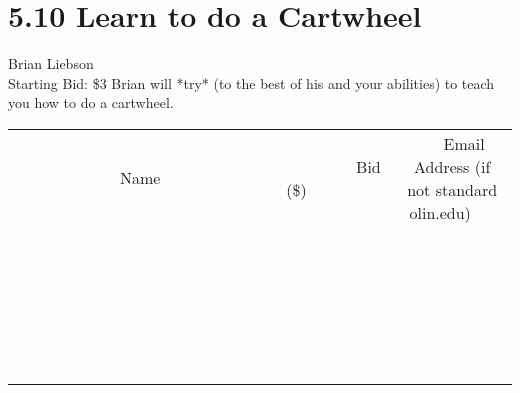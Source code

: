 \documentclass[11pt]{article}
\begin{document}
\section*{5.10 Learn to do a Cartwheel}
Brian Liebson
\\
Starting Bid: \$3
\newline
Brian will *try* (to the best of his and your abilities) to teach you how to do a cartwheel.
\\[6ex]
\begin{tabular}{c c c}
~~~~~~~~~~~~~Name~~~~~~~~~~~~~ & ~~~~~~~~~Bid (\$)~~~~~~~~~  & ~~~Email Address (if not standard olin.edu)~~~\\
 & & \\
\hline
 & & \\
\hline
 & & \\
\hline
 & & \\
\hline
 & & \\
\hline
 & & \\
\hline
 & & \\
\hline
 & & \\
\hline
 & & \\
\hline
 & & \\
\hline
 & & \\
\hline
 & & \\
\hline
 & & \\
\hline
 & & \\
\hline
 & & \\
\hline
 & & \\
\hline
 & & \\
\hline
 & & \\
\hline
 & & \\
\hline
 & & \\
\hline
 & & \\
\hline
 & & \\
\hline
 & & \\
\hline
 & & \\
\hline
 & & \\
\hline
 & & \\
\hline
\end{tabular}
\newpage
\end{document}
